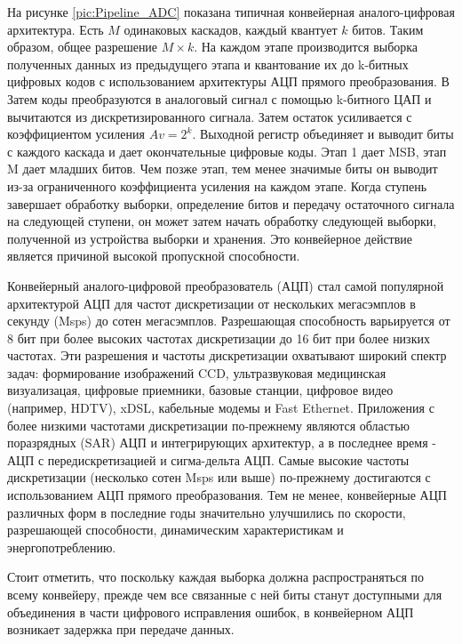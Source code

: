 \documentclass[a4paper,12pt]{article} %
\begin{document}
На рисунке \ref{pic:Pipeline_ADC} показана типичная конвейерная аналого-цифровая архитектура. Есть $M$ одинаковых каскадов, каждый квантует $k$ битов. Таким образом, общее разрешение $ M\times  k $. На каждом этапе производится выборка полученных данных из предыдущего этапа и квантование их до k-битных цифровых кодов с использованием архитектуры АЦП прямого преобразования. В Затем коды преобразуются в аналоговый сигнал с помощью k-битного ЦАП и вычитаются из дискретизированного сигнала. Затем остаток усиливается с коэффициентом усиления $ Av = 2^k $. Выходной регистр объединяет и  выводит биты с каждого каскада и дает окончательные цифровые коды. Этап 1 дает MSB, этап M дает младших битов. Чем позже этап, тем менее значимые биты он выводит из-за ограниченного коэффициента усиления на каждом этапе. Когда ступень завершает обработку выборки, определение битов и передачу остаточного сигнала на следующей ступени, он может затем начать обработку следующей выборки, полученной из устройства выборки и хранения. Это конвейерное действие является причиной высокой пропускной способности. \cite{pipelineADC}

Конвейерный аналого-цифровой преобразователь (АЦП) стал самой популярной архитектурой АЦП для частот дискретизации от нескольких мегасэмплов в секунду (Msps) до сотен мегасэмплов. Разрешающая способность варьируется от 8 бит при более высоких частотах дискретизации до 16 бит при более низких частотах. Эти разрешения и частоты дискретизации охватывают широкий спектр задач: формирование изображений CCD, ультразвуковая медицинская визуализацая, цифровые приемники, базовые станции, цифровое видео (например, HDTV), xDSL, кабельные модемы и Fast Ethernet. Приложения с более низкими частотами дискретизации по-прежнему являются областью поразрядных (SAR)  АЦП и интегрирующих архитектур, а в последнее время - АЦП с передискретизацией и сигма-дельта АЦП. Самые высокие частоты дискретизации (несколько сотен Msps или выше) по-прежнему достигаются с использованием АЦП прямого преобразования. Тем не менее, конвейерные АЦП различных форм в последние годы значительно улучшились по скорости, разрешающей способности, динамическим характеристикам и энергопотреблению.






Стоит отметить, что поскольку каждая выборка должна распространяться по всему конвейеру, прежде чем все связанные с ней биты станут доступными для объединения в части цифрового исправления ошибок, в конвейерном АЦП возникает задержка при передаче данных. 
\end{document}
